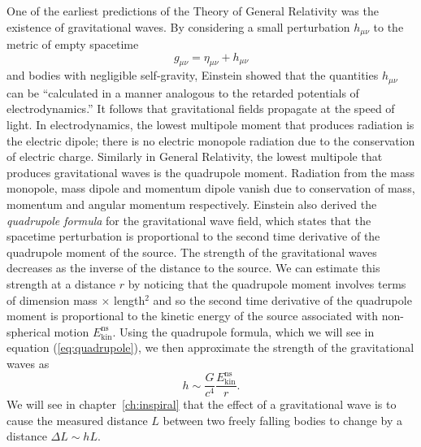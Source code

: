 One of the earliest predictions of the Theory of General Relativity was the
existence of gravitational waves. By considering a small perturbation
$h_{\mu\nu}$ to the metric of empty spacetime
\begin{equation}
g_{\mu\nu} = \eta_{\mu\nu} + h_{\mu\nu}
\end{equation}
and bodies with negligible self-gravity, Einstein showed that the quantities
$h_{\mu\nu}$ can be ``calculated in a manner analogous to the retarded
potentials of electrodynamics\cite{Einstein:1916}.''  
It follows that
gravitational fields propagate at the speed of light.  In electrodynamics, the
lowest multipole moment that produces radiation is the electric dipole; there
is no electric monopole radiation due to the conservation of electric charge.
Similarly in General Relativity, the lowest multipole that produces
gravitational waves is the quadrupole moment. Radiation from the 
mass monopole, mass dipole and momentum dipole vanish due to conservation of
mass, momentum and angular momentum respectively. Einstein also derived the
\emph{quadrupole formula} for the gravitational wave field, which states that
the spacetime perturbation is proportional to the second time derivative of
the quadrupole moment of the source.  The strength of the gravitational waves
decreases as the inverse of the distance to the source.  We can estimate
this strength at a distance $r$ by noticing that the quadrupole moment
involves terms of dimension mass $\times$ length$^2$ and so the second time
derivative of the quadrupole moment is proportional to the kinetic energy of the source
associated with non-spherical motion $E^\mathrm{ns}_\mathrm{kin}$. Using the
quadrupole formula, which we will see in equation (\ref{eq:quadrupole}), we
then approximate the strength of the gravitational waves as
\begin{equation}
h \sim \frac{G}{c^4}\frac{E^\mathrm{ns}_\mathrm{kin}}{r}.
\label{eq:strainest}
\end{equation}
We will see in chapter~\ref{ch:inspiral} that the effect of a
gravitational wave is to cause the measured distance $L$ between two freely
falling bodies to change by a distance $\Delta L \sim h L$. 

